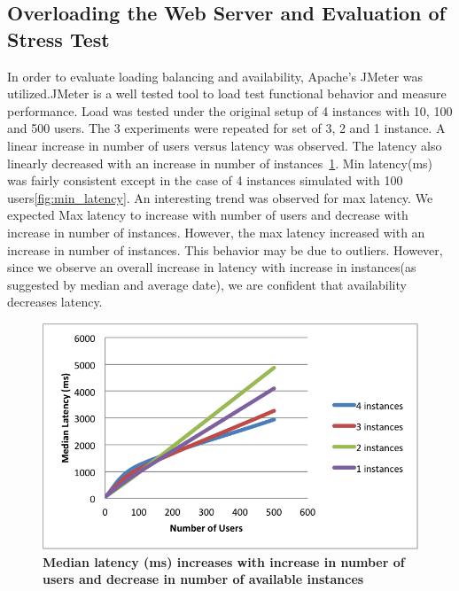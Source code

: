 \documentclass[12pt]{article}
\begin{document}
\subsection{Overloading the Web Server and Evaluation of Stress Test}
In order to evaluate loading balancing and availability, Apache's JMeter was
utilized.JMeter is a well tested tool to load test functional behavior and
measure performance\cite{apache}. Load was tested under the original setup of 4
instances with 10, 100 and 500 users. The 3 experiments were repeated for set of
3, 2 and 1 instance. A linear increase in number of users versus latency was
observed. The latency also linearly decreased with an increase in number of
instances~\ref{fig:median_latency}. Min latency(ms) was fairly consistent except in the case of 4 instances simulated with 100 users\ref{fig:min_latency}. An interesting trend was observed for max latency. We expected Max latency to increase with number of users and decrease with increase in number of instances. However, the max latency increased with an increase in number of instances. This behavior may be due to outliers. However, since we observe an overall increase in latency with increase in instances(as suggested by median and average date), we are confident that availability decreases latency. 
\begin{figure}[H]
  \centering
      \includegraphics[scale=0.45]{Images/median_latency.PNG}
  \caption{\textbf{Median latency (ms) increases with increase in number of users and decrease in number of available instances} }
\label{fig:median_latency}
\end{figure}
\end{document}
